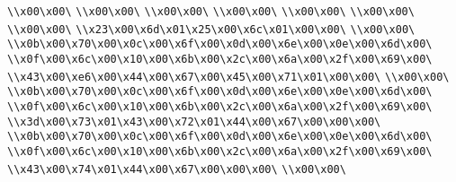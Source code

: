 \verb|\\x00\x00\|\newline
\verb|\\x00\x00\|\newline
\verb|\\x00\x00\|\newline
\verb|\\x00\x00\|\newline
\verb|\\x00\x00\|\newline
\verb|\\x00\x00\|\newline
\verb|\\x00\x00\|\newline
\verb|\\x23\x00\x6d\x01\x25\x00\x6c\x01\x00\x00\|\newline
\verb|\\x00\x00\|\newline
\verb|\\x0b\x00\x70\x00\x0c\x00\x6f\x00\x0d\x00\x6e\x00\x0e\x00\x6d\x00\|\newline
\verb|\\x0f\x00\x6c\x00\x10\x00\x6b\x00\x2c\x00\x6a\x00\x2f\x00\x69\x00\|\newline
\verb|\\x43\x00\xe6\x00\x44\x00\x67\x00\x45\x00\x71\x01\x00\x00\|\newline
\verb|\\x00\x00\|\newline
\verb|\\x0b\x00\x70\x00\x0c\x00\x6f\x00\x0d\x00\x6e\x00\x0e\x00\x6d\x00\|\newline
\verb|\\x0f\x00\x6c\x00\x10\x00\x6b\x00\x2c\x00\x6a\x00\x2f\x00\x69\x00\|\newline
\verb|\\x3d\x00\x73\x01\x43\x00\x72\x01\x44\x00\x67\x00\x00\x00\|\newline
\verb|\\x0b\x00\x70\x00\x0c\x00\x6f\x00\x0d\x00\x6e\x00\x0e\x00\x6d\x00\|\newline
\verb|\\x0f\x00\x6c\x00\x10\x00\x6b\x00\x2c\x00\x6a\x00\x2f\x00\x69\x00\|\newline
\verb|\\x43\x00\x74\x01\x44\x00\x67\x00\x00\x00\|\newline
\verb|\\x00\x00\|\newline
